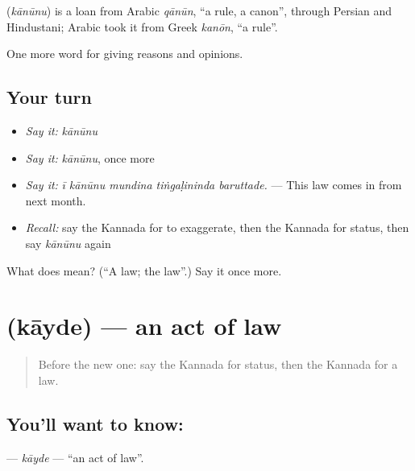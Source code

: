 \begin{cousinweb}
\textbf{} (\emph{kānūnu}) is a loan from Arabic \emph{qānūn}, \textquotedblleft{}a rule, a canon\textquotedblright{}, through Persian and Hindustani; Arabic took it from Greek \emph{kanōn}, \textquotedblleft{}a rule\textquotedblright{}.
\end{cousinweb}

\begin{grammarlens}[title={What you've built}]
One more word for giving reasons and opinions.
\end{grammarlens}

\subsection*{Your turn}
\begin{itemize}
\raggedright
  \item \emph{Say it:} \emph{kānūnu}
  \item \emph{Say it:} \emph{kānūnu}, once more
  \item \emph{Say it:} \emph{ī kānūnu mundina tiṅgaḷininda baruttade.} — This law comes in from next month.
  \item \emph{Recall:} say the Kannada for to exaggerate, then the Kannada for status, then say \emph{kānūnu} again
\end{itemize}

\begin{tcolorbox}[breakable,colback=teal!4,colframe=teal!35!black,title={Before you move on}]
What does  mean? (\textquotedblleft{}A law; the law\textquotedblright{}.) Say it once more.
\end{tcolorbox}
\section[\texorpdfstring{\kn{ಕಾಯ್ದೆ} (kāyde)}{ಕಾಯ್ದೆ (kāyde)}]{ (kāyde) — an act of law}

\label{lesson:KA-C390-kayde}



\begin{quote}
Before the new one: say the Kannada for status, then the Kannada for a law.
\end{quote}

\subsection*{You'll want to know: }
\textbf{} — \emph{kāyde} — \textquotedblleft{}an act of law\textquotedblright{}.

